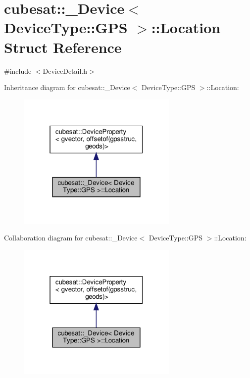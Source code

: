 \hypertarget{structcubesat_1_1__Device_3_01DeviceType_1_1GPS_01_4_1_1Location}{}\section{cubesat\+:\+:\+\_\+\+Device$<$ Device\+Type\+:\+:G\+PS $>$\+:\+:Location Struct Reference}
\label{structcubesat_1_1__Device_3_01DeviceType_1_1GPS_01_4_1_1Location}


{\ttfamily \#include $<$Device\+Detail.\+h$>$}



Inheritance diagram for cubesat\+:\+:\+\_\+\+Device$<$ Device\+Type\+:\+:G\+PS $>$\+:\+:Location\+:\nopagebreak
\begin{figure}[H]
\begin{center}
\leavevmode
\includegraphics[width=220pt]{structcubesat_1_1__Device_3_01DeviceType_1_1GPS_01_4_1_1Location__inherit__graph}
\end{center}
\end{figure}


Collaboration diagram for cubesat\+:\+:\+\_\+\+Device$<$ Device\+Type\+:\+:G\+PS $>$\+:\+:Location\+:\nopagebreak
\begin{figure}[H]
\begin{center}
\leavevmode
\includegraphics[width=220pt]{structcubesat_1_1__Device_3_01DeviceType_1_1GPS_01_4_1_1Location__coll__graph}
\end{center}
\end{figure}
